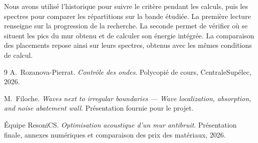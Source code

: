\documentclass[11pt,a4paper]{article}
\begin{document}
Nous avons utilisé l'historique pour suivre le critère pendant les calculs, puis les spectres pour comparer les répartitions sur la bande étudiée. La première lecture renseigne sur la progression de la recherche. La seconde permet de vérifier où se situent les pics du mur obtenu et de calculer son énergie intégrée. La comparaison des placements repose ainsi sur leurs spectres, obtenus avec les mêmes conditions de calcul.


\clearpage
{}
\begin{thebibliography}{9}
A.~Rozanova-Pierrat.
\emph{Contrôle des ondes}.
Polycopié de cours, CentraleSupélec, 2026.

M.~Filoche.
\emph{Waves next to irregular boundaries --- Wave localization, absorption, and noise abatement wall}.
Présentation fournie pour le projet.

Équipe ResoniCS.
\emph{Optimisation acoustique d'un mur antibruit}.
Présentation finale, annexes numériques et comparaison des prix des matériaux, 2026.
\end{thebibliography}
\end{document}
